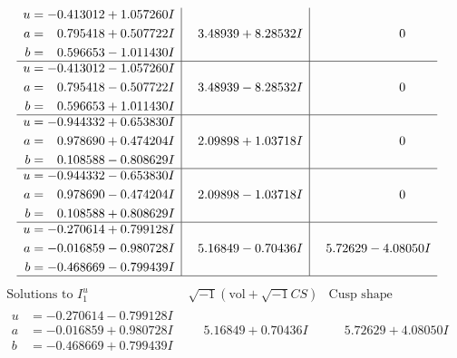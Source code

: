 \documentclass[1p]{elsarticle_modified}
\theoremstyle{definition}
\newcommand{\I}{\sqrt{-1}}
\begin{document}
$$\begin{array}{c|c|c}
\begin{aligned}
u &= -0.413012 + 1.057260 I \\
a &= \phantom{-}0.795418 + 0.507722 I \\
b &= \phantom{-}0.596653 - 1.011430 I\end{aligned}
 & \phantom{-}3.48939 + 8.28532 I & \phantom{-0.000000 } 0 \\ \hline\begin{aligned}
u &= -0.413012 - 1.057260 I \\
a &= \phantom{-}0.795418 - 0.507722 I \\
b &= \phantom{-}0.596653 + 1.011430 I\end{aligned}
 & \phantom{-}3.48939 - 8.28532 I & \phantom{-0.000000 } 0 \\ \hline\begin{aligned}
u &= -0.944332 + 0.653830 I \\
a &= \phantom{-}0.978690 + 0.474204 I \\
b &= \phantom{-}0.108588 - 0.808629 I\end{aligned}
 & \phantom{-}2.09898 + 1.03718 I & \phantom{-0.000000 } 0 \\ \hline\begin{aligned}
u &= -0.944332 - 0.653830 I \\
a &= \phantom{-}0.978690 - 0.474204 I \\
b &= \phantom{-}0.108588 + 0.808629 I\end{aligned}
 & \phantom{-}2.09898 - 1.03718 I & \phantom{-0.000000 } 0 \\ \hline\begin{aligned}
u &= -0.270614 + 0.799128 I \\
a &= -0.016859 - 0.980728 I \\
b &= -0.468669 - 0.799439 I\end{aligned}
 & \phantom{-}5.16849 - 0.70436 I & \phantom{-}5.72629 - 4.08050 I\\
 \hline 
 \end{array}$$\newpage$$\begin{array}{c|c|c}  
\text{Solutions to }I^u_{1}& \I (\text{vol} + \sqrt{-1}CS) & \text{Cusp shape}\\
 \hline 
\begin{aligned}
u &= -0.270614 - 0.799128 I \\
a &= -0.016859 + 0.980728 I \\
b &= -0.468669 + 0.799439 I\end{aligned}
 & \phantom{-}5.16849 + 0.70436 I & \phantom{-}5.72629 + 4.08050 I \\ \hline\begin{aligned}

\end{aligned}
\end{array}$$
\end{document}
